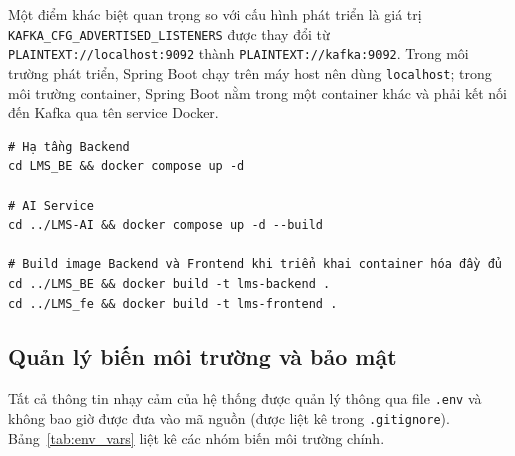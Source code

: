 Một điểm khác biệt quan trọng so với cấu hình phát triển là giá trị
\texttt{KAFKA\_CFG\_ADVERTISED\_LISTENERS} được thay đổi từ
\texttt{PLAINTEXT://localhost:9092} thành \texttt{PLAINTEXT://kafka:9092}.
Trong môi trường phát triển, Spring Boot chạy trên máy host nên dùng
\texttt{localhost}; trong môi trường container, Spring Boot nằm trong một
container khác và phải kết nối đến Kafka qua tên service Docker.

\begin{verbatim}
# Hạ tầng Backend
cd LMS_BE && docker compose up -d

# AI Service
cd ../LMS-AI && docker compose up -d --build

# Build image Backend và Frontend khi triển khai container hóa đầy đủ
cd ../LMS_BE && docker build -t lms-backend .
cd ../LMS_fe && docker build -t lms-frontend .
\end{verbatim}

\subsection{Quản lý biến môi trường và bảo mật}

Tất cả thông tin nhạy cảm của hệ thống được quản lý thông qua file \texttt{.env}
và không bao giờ được đưa vào mã nguồn (được liệt kê trong \texttt{.gitignore}).
Bảng~\ref{tab:env_vars} liệt kê các nhóm biến môi trường chính.

